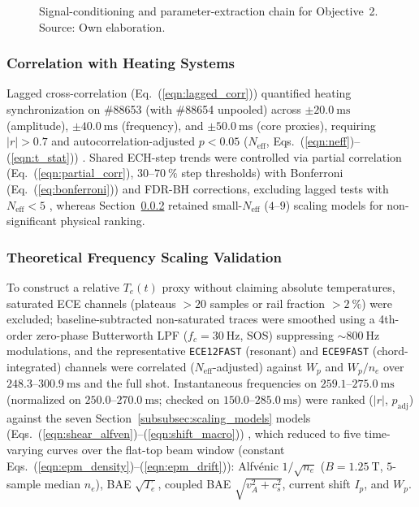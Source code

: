 \begin{figure}[H]
  \caption[Signal-conditioning and parameter-extraction chain for Objective 2]{Signal-conditioning and parameter-extraction chain for Objective~2. Source: Own elaboration.}
  \label{fig:methodology2}
\end{figure}

\subsubsection{Correlation with Heating Systems}
Lagged cross-correlation (Eq.~(\ref{eqn:lagged_corr})) \cite{bendat2010random, Zhong2024} quantified heating synchronization on \#88653 (with \#88654 unpooled) across $\pm 20.0~\mathrm{ms}$ (amplitude), $\pm 40.0~\mathrm{ms}$ (frequency), and $\pm 50.0~\mathrm{ms}$ (core proxies), requiring $|r| > 0.7$ and autocorrelation-adjusted $p < 0.05$ ($N_{\mathrm{eff}}$, Eqs.~(\ref{eqn:neff})--(\ref{eqn:t_stat})) \cite{shumway2017time}. Shared ECH-step trends were controlled via partial correlation (Eq.~(\ref{eqn:partial_corr}), $30\text{--}70~\%$ step thresholds) \cite{james2021statistical} with Bonferroni (Eq.~(\ref{eq:bonferroni})) and FDR-BH corrections, excluding lagged tests with $N_{\mathrm{eff}} < 5$ \cite{dunn1961multiple, Benjamini1995}, whereas Section~\ref{subsubsec:method_scaling} retained small-$N_{\mathrm{eff}}$ ($4\text{--}9$) scaling models for non-significant physical ranking.

\subsubsection{Theoretical Frequency Scaling Validation}
\label{subsubsec:method_scaling}
To construct a relative $T_e(t)$ proxy without claiming absolute temperatures, saturated ECE channels (plateaus $> 20$ samples or rail fraction $> 2~\%$) were excluded; baseline-subtracted non-saturated traces were smoothed using a 4th-order zero-phase Butterworth LPF ($f_c = 30~\mathrm{Hz}$, SOS) suppressing ${\sim}800~\mathrm{Hz}$ modulations, and the representative \texttt{ECE12FAST} (resonant) and \texttt{ECE9FAST} (chord-integrated) channels were correlated ($N_{\mathrm{eff}}$-adjusted) against $W_p$ and $W_p/n_e$ over $248.3$--$300.9~\mathrm{ms}$ and the full shot. Instantaneous frequencies on $259.1$--$275.0~\mathrm{ms}$ (normalized on $250.0$--$270.0~\mathrm{ms}$; checked on $150.0$--$285.0~\mathrm{ms}$) were ranked ($|r|$, $p_{\mathrm{adj}}$) against the seven Section~\ref{subsubsec:scaling_models} models (Eqs.~(\ref{eqn:shear_alfven})--(\ref{eqn:shift_macro})) \cite{chen2016introduction, Varela2024}, which reduced to five time-varying curves over the flat-top beam window (constant Eqs.~(\ref{eqn:epm_density})--(\ref{eqn:epm_drift})): Alfv\'enic $1/\sqrt{n_e}$ ($B = 1.25~\mathrm{T}$, $5$-sample median $n_e$), BAE $\sqrt{T_e}$, coupled BAE $\sqrt{v_A^2+c_s^2}$, current shift $I_p$, and $W_p$.

